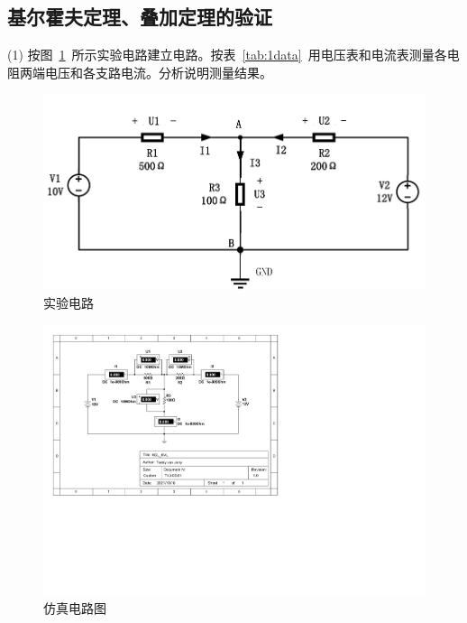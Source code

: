 \documentclass[12pt]{SEU-Circuit-Report}
\begin{document}
        \subsection{基尔霍夫定理、叠加定理的验证}\label{subsec:exp1}
            (1) 按图~\ref{fig:1init}~所示实验电路建立电路。按表~\ref{tab:1data}~用电压表和电流表测量各电阻两端电压和各支路电流。分析说明测量结果。
            \begin{figure}[htbp]
                \centering
                \includegraphics[width=.8\linewidth]{fig/实验电路1.pdf}
                \caption{实验电路}
                \label{fig:1init}
            \end{figure}
            \begin{figure}[htbp]
                \centering
                \includegraphics[width=.8\linewidth]{KCL_KVL.pdf}
                \caption{仿真电路图}
                \label{fig:1circuit}
            \end{figure}
\end{document}
